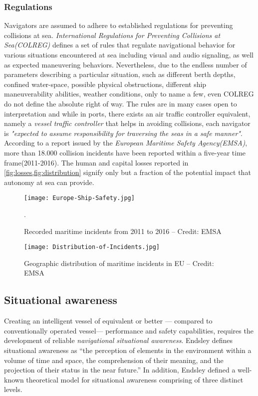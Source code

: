 \subsubsection{Regulations}
Navigators are assumed to adhere to established regulations for preventing collisions at sea. \emph{International Regulations for Preventing Collisions at Sea(COLREG)} defines a set of rules that regulate navigational behavior for various situations encountered at sea including visual and audio signaling,  as well as expected maneuvering behaviors. Nevertheless, due to the endless number of parameters describing a particular situation, such as different berth depths, confined water-space, possible physical obstructions, different ship maneuverability abilities, weather conditions, only to name a few, even COLREG do not define the absolute right of way. The rules are in many cases open to interpretation and while in ports, there exists an air traffic controller equivalent, namely a \emph{vessel traffic controller} that helps in avoiding collisions, each navigator is \textit{"expected to assume responsibility for traversing the seas in a safe manner"}. According to a report issued by the \emph{European Maritime Safety Agency(EMSA)}, more than 18.000 collision incidents have been reported within a five-year time frame(2011-2016). The human and capital losses reported in \cref{fig:losses,fig:distribution} signify only but a fraction of the potential impact that autonomy at sea can provide.

\begin{figure}[H]
	\centering
	\texttt{[image: Europe-Ship-Safety.jpg]}
	\caption{Recorded maritime incidents from 2011 to 2016 – Credit: EMSA}.
	\label{fig:losses}
\end{figure}


\begin{figure}[H]
	\centering
	\texttt{[image: Distribution-of-Incidents.jpg]}
	\caption{Geographic distribution of maritime incidents in EU – Credit: EMSA}
	\label{fig:distribution}
\end{figure}

\subsection{Situational awareness}
Creating an intelligent vessel of equivalent or better --- compared to conventionally operated vessel--- performance and safety capabilities, requires the development of reliable \emph{navigational situational awareness}. Endsley  \cite{Endsley1995} defines situational awareness as “the perception of elements in the environment within a volume of time and space, the comprehension of their meaning, and the projection of their status in the near future.”  In addition, Endsley defined a well-known theoretical model for situational awareness  \cite{Endsley2001,Endsley1995} comprising of three distinct levels.

